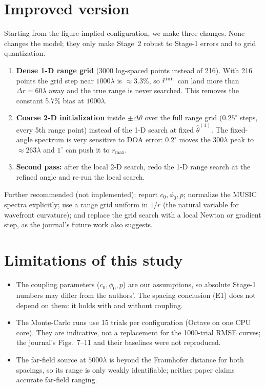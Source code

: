 \documentclass[11pt,a4paper]{article}
\begin{document}
\section{Improved version}\label{sec:improved}
Starting from the figure-implied configuration, we make three changes. None changes the model; they only make
Stage~2 robust to Stage-1 errors and to grid quantization.
\begin{enumerate}
\item \textbf{Dense 1-D range grid} (3000 log-spaced points instead of 216). With 216 points the grid step near
$1000\lambda$ is $\approx3.3\%$, so $\hat r^{\rm init}$ can land more than $\Delta r=60\lambda$ away and the true range
is never searched. This removes the constant 5.7\% bias at $1000\lambda$.
\item \textbf{Coarse 2-D initialization} inside $\pm\Delta\theta$ over the full range grid ($0.25^\circ$ steps, every
5th range point) instead of the 1-D search at fixed $\hat\theta^{(1)}$. The fixed-angle spectrum is very sensitive to
DOA error: $0.2^\circ$ moves the $300\lambda$ peak to $\approx263\lambda$ and $1^\circ$ can push it to $r_{\max}$.
\item \textbf{Second pass:} after the local 2-D search, redo the 1-D range search at the refined angle and re-run the local search.
\end{enumerate}
Further recommended (not implemented): report $c_0,\phi_0,p$; normalize the MUSIC spectra explicitly; use a range grid
uniform in $1/r$ (the natural variable for wavefront curvature); and replace the grid search with a local Newton or
gradient step, as the journal's future work also suggests.


\section{Limitations of this study}
\begin{itemize}
\item The coupling parameters ($c_0,\phi_0,p$) are our assumptions, so absolute Stage-1 numbers may differ from the
authors'. The spacing conclusion (E1) does not depend on them: it holds with and without coupling.
\item The Monte-Carlo runs use 15 trials per configuration (Octave on one CPU core). They are indicative, not a
replacement for the 1000-trial RMSE curves; the journal's Figs.~7--11 and their baselines were not reproduced.
\item The far-field source at $5000\lambda$ is beyond the Fraunhofer distance for both spacings, so its range is only
weakly identifiable; neither paper claims accurate far-field ranging.
\end{itemize}
\end{document}
